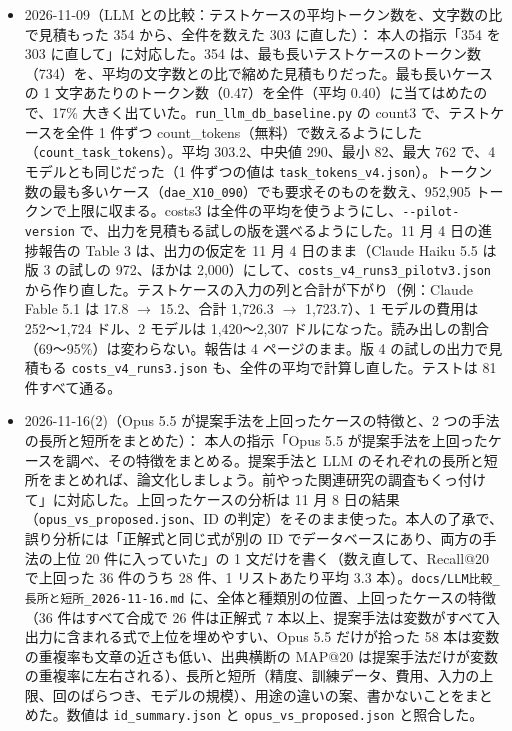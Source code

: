 \documentclass[11pt,a4paper]{jsarticle}
\begin{document}
\begin{itemize}[nosep]
    \textbf{報告書の訂正}：11 月 17 日の報告の「提案手法の学習は 1 通りの分け方につき 2 分以内」は記録と合わなかったので、「学習と評価は平均 161 秒（6 本を並列に実行したときの時間）」に直した（\texttt{experiments/kato1021/sweep.json}）。
    \textbf{図}：論文用に、拡張ケースの棒を除いたデータの構成の図と、分割のそろい方の図（種 42、訓練用 975 件とテスト用 407 件）を作った（\texttt{generate\_figures\_thesis.py} の \texttt{dataset(augmented=False)} と \texttt{split\_balance(paper=True)}。修論の図は変えていない）。
    \textbf{未確認}：投稿規定のページは自動では読めなかった。Highlights の要否と字数、キーワードの数、引用の形式、AI 利用の申告の文言、査読の方式は、本人が規定で確かめる。
  \item 2026-11-09（LLM との比較：テストケースの平均トークン数を、文字数の比で見積もった 354 から、全件を数えた 303 に直した）：
    本人の指示「354 を 303 に直して」に対応した。354 は、最も長いテストケースのトークン数（734）を、平均の文字数との比で縮めた見積もりだった。最も長いケースの 1 文字あたりのトークン数（0.47）を全件（平均 0.40）に当てはめたので、17\% 大きく出ていた。\texttt{run\_llm\_db\_baseline.py} の count3 で、テストケースを全件 1 件ずつ count\_tokens（無料）で数えるようにした（\texttt{count\_task\_tokens}）。平均 303.2、中央値 290、最小 82、最大 762 で、4 モデルとも同じだった（1 件ずつの値は \texttt{task\_tokens\_v4.json}）。トークン数の最も多いケース（\texttt{dae\_X10\_090}）でも要求そのものを数え、952,905 トークンで上限に収まる。costs3 は全件の平均を使うようにし、\texttt{-{}-pilot-version} で、出力を見積もる試しの版を選べるようにした。11 月 4 日の進捗報告の Table 3 は、出力の仮定を 11 月 4 日のまま（Claude Haiku 5.5 は版 3 の試しの 972、ほかは 2,000）にして、\texttt{costs\_v4\_runs3\_pilotv3.json} から作り直した。テストケースの入力の列と合計が下がり（例：Claude Fable 5.1 は 17.8 $\to$ 15.2、合計 1,726.3 $\to$ 1,723.7）、1 モデルの費用は 252〜1,724 ドル、2 モデルは 1,420〜2,307 ドルになった。読み出しの割合（69〜95\%）は変わらない。報告は 4 ページのまま。版 4 の試しの出力で見積もる \texttt{costs\_v4\_runs3.json} も、全件の平均で計算し直した。テストは 81 件すべて通る。
  \item 2026-11-16(2)（Opus 5.5 が提案手法を上回ったケースの特徴と、2 つの手法の長所と短所をまとめた）：
    本人の指示「Opus 5.5 が提案手法を上回ったケースを調べ、その特徴をまとめる。提案手法と LLM のそれぞれの長所と短所をまとめれば、論文化しましょう。前やった関連研究の調査もくっ付けて」に対応した。上回ったケースの分析は 11 月 8 日の結果（\texttt{opus\_vs\_proposed.json}、ID の判定）をそのまま使った。本人の了承で、誤り分析には「正解式と同じ式が別の ID でデータベースにあり、両方の手法の上位 20 件に入っていた」の 1 文だけを書く（数え直して、Recall@20 で上回った 36 件のうち 28 件、1 リストあたり平均 3.3 本）。\texttt{docs/LLM比較\_長所と短所\_2026-11-16.md} に、全体と種類別の位置、上回ったケースの特徴（36 件はすべて合成で 26 件は正解式 7 本以上、提案手法は変数がすべて入出力に含まれる式で上位を埋めやすい、Opus 5.5 だけが拾った 58 本は変数の重複率も文章の近さも低い、出典横断の MAP@20 は提案手法だけが変数の重複率に左右される）、長所と短所（精度、訓練データ、費用、入力の上限、回のばらつき、モデルの規模）、用途の違いの案、書かないことをまとめた。数値は \texttt{id\_summary.json} と \texttt{opus\_vs\_proposed.json} と照合した。

\end{itemize}
\end{document}
